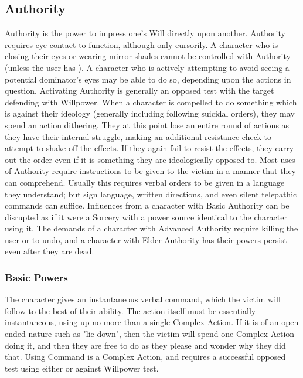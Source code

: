 \subsection{Authority}

Authority is the power to impress one's Will directly upon another. Authority requires eye contact to function, although only cursorily. A character who is closing their eyes or wearing mirror shades cannot be controlled with Authority (unless the user has ). A character who is actively attempting to avoid seeing a potential dominator's eyes may be able to do so, depending upon the actions in question. Activating Authority is generally an opposed test with the target defending with Willpower. When a character is compelled to do something which is against their ideology (generally including following suicidal orders), they may spend an action dithering. They at this point lose an entire round of actions as they have their internal struggle, making an additional resistance check to attempt to shake off the effects. If they again fail to resist the effects, they carry out the order even if it is something they are ideologically opposed to. Most uses of Authority require instructions to be given to the victim in a manner that they can comprehend. Usually this requires verbal orders to be given in a language they understand; but sign language, written directions, and even silent telepathic commands can suffice. Influences from a character with Basic Authority can be disrupted as if it were a Sorcery with a power source identical to the character using it. The demands of a character with Advanced Authority require killing the user or  to undo, and a character with Elder Authority has their powers persist even after they are dead.

\subsubsection{Basic Powers}

 The character gives an instantaneous verbal command, which the victim will follow to the best of their ability. The action itself must be essentially instantaneous, using up no more than a single Complex Action. If it is of an open ended nature such as "lie down", then the victim will spend one Complex Action doing it, and then they are free to do as they please and wonder why they did that. Using Command is a Complex Action, and requires a successful opposed test using either  or  against Willpower test.

